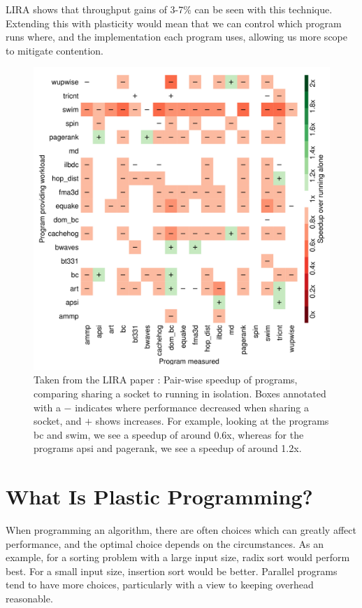 LIRA \cite{lira} shows that throughput gains of 3-7\% can be seen with this technique. Extending this with plasticity would mean that we can control which program runs where, and the implementation each program uses, allowing us more scope to mitigate contention.

\begin{figure}[H]
	\includegraphics[width=\textwidth]{graphics/lira_pairwise_speedup.png}
	\caption{Taken from the LIRA paper \cite{lira}: Pair-wise speedup of programs, comparing sharing a socket to running in isolation. Boxes annotated with a $-$ indicates where performance decreased when sharing a socket, and $+$ shows increases. For example, looking at the programs bc and swim, we see a speedup of around 0.6x, whereas for the programs apsi and pagerank, we see a speedup of around 1.2x.}
	\label{fig:lira_pairwise_speedup}
\end{figure}





\section{What Is Plastic Programming?}
\label{section:background:what_is_plastic_programming}

When programming an algorithm, there are often choices which can greatly affect performance, and the optimal choice depends on the circumstances. As an example, for a sorting problem with a large input size, radix sort would perform best. For a small input size, insertion sort would be better. Parallel programs tend to have more choices, particularly with a view to keeping overhead reasonable.

